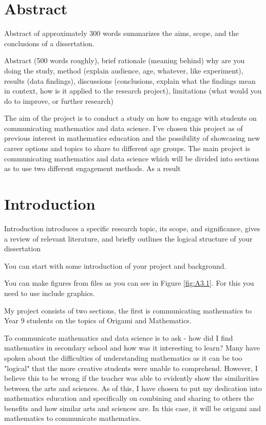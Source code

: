 \documentclass[12pt, a4paper,oneside]{book}
\numberwithin{equation}{section}
\begin{document}

\chapter*{Abstract}

Abstract of approximately 300 words summarizes the aims, scope, and the conclusions of a dissertation.

Abstract (500 words roughly), brief rationale (meaning behind) why are you doing the study, method (explain audience, age, whatever, like experiment), results (data findings), discussions (conclusions, explain what the findings mean in context, how is it applied to the research project), limitations (what would you do to improve, or further research)

The aim of the project is to conduct a study on how to engage with students on communicating mathematics and data science. I've chosen this project as of previous interest in mathematics education and the possibility of showcasing new career options and topics to share to different age groups. The main project is communicating mathematics and data science which will be divided into sections as to use two different engagement methods. As a result

\chapter{Introduction}\label{ch:x}

Introduction introduces a specific research topic, its scope, and significance, gives a review of relevant literature, and briefly outlines the logical structure of your dissertation

You can start with some introduction of your project and background.

You can make figures  from files as you can see in Figure \ref{fig:A3.1}. For this you need to use include graphics.

My project consists of two sections, the first is communicating mathematics to Year 9 students on the topics of Origami and Mathematics.

To communicate mathematics and data science is to ask - how did I find mathematics in secondary school and how was it interesting to learn? Many have spoken about the difficulties of understanding mathematics as it can be too "logical" that the more creative students were unable to comprehend. However, I believe this to be wrong if the teacher was able to evidently show the similarities between the arts and sciences. As of this, I have chosen to put my dedication into mathematics education and specifically on combining and sharing to others the benefits and how similar arts and sciences are. In this case, it will be origami and mathematics to communicate mathematics.
\end{document}
